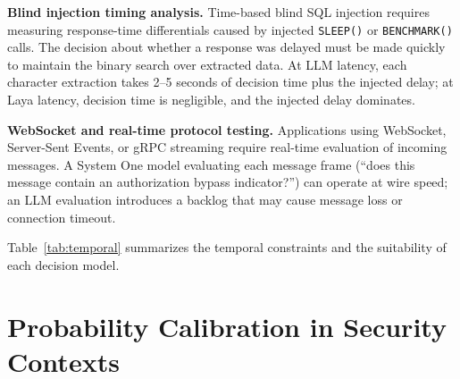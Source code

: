 \documentclass[conference]{IEEEtran}
\begin{document}
\textbf{Blind injection timing analysis.} Time-based blind SQL injection requires measuring response-time differentials caused by injected \texttt{SLEEP()} or \texttt{BENCHMARK()} calls. The decision about whether a response was delayed must be made quickly to maintain the binary search over extracted data. At LLM latency, each character extraction takes 2--5 seconds of decision time plus the injected delay; at Laya latency, decision time is negligible, and the injected delay dominates.

\textbf{WebSocket and real-time protocol testing.} Applications using WebSocket, Server-Sent Events, or gRPC streaming require real-time evaluation of incoming messages. A System One model evaluating each message frame (``does this message contain an authorization bypass indicator?'') can operate at wire speed; an LLM evaluation introduces a backlog that may cause message loss or connection timeout.

Table~\ref{tab:temporal} summarizes the temporal constraints and the suitability of each decision model.

\begin{table}[h]
\centering
\caption{Temporal constraints in offensive-security scenarios.}
\label{tab:temporal}
\small
{}
\end{table}

\section{Probability Calibration in Security Contexts}\label{sec:calibration}
\end{document}

